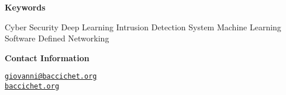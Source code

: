 \vspace{1cm}

{\bf\Huge Keywords}

\vspace{1cm}

\begin{itemize}
    \itemAR Cyber Security
    \itemAR Deep Learning
    \itemAR Intrusion Detection System
    \itemAR Machine Learning
    \itemAR Software Defined Networking
\end{itemize}

\vspace{1cm}

{\bf\Huge Contact Information}

\vspace{1cm}

\faEnvelope[regular]\; \href{mailto:giovanni@baccichet.org}{\texttt{giovanni@baccichet.org}} \\

\faGlobeAmericas\; \href{https://baccichet.org}{\texttt{baccichet.org}}